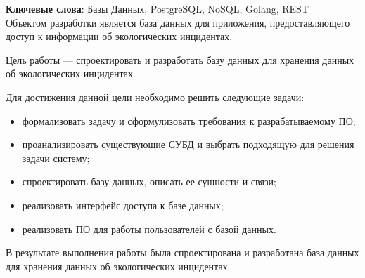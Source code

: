 \begin{essay}{}
    \noindent\textbf{Ключевые слова}: Базы Данных, PostgreSQL, NoSQL, Golang, REST\\
        
    Объектом разработки является база данных для приложения, предоставляющего доступ к информации об экологических инцидентах.
    
    Цель работы --- спроектировать и разработать базу данных для хранения данных об экологических инцидентах.
    
    Для достижения данной цели необходимо решить следующие задачи:
    
    \begin{itemize}
    	\item формализовать задачу и сформулизовать требования к разрабатываемому ПО;
    	\item проанализировать существующие СУБД и выбрать подходящую для решения задачи систему;
    	\item спроектировать базу данных, описать ее сущности и связи;
    	\item реализовать интерфейс доступа к базе данных;
    	\item реализовать ПО для работы пользователей с базой данных.
    \end{itemize}
    
    В результате выполнения работы была спроектирована и разработана база данных для хранения данных об экологических инцидентах.  
\end{essay}